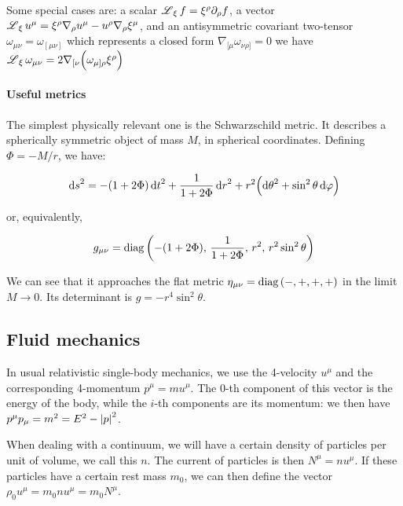 \documentclass[main.tex]{subfiles}
\begin{document}
Some special cases are: a scalar \(\operatorname*{\mathscr L} _\xi f = \xi^\rho \partial_\rho f \), a vector \(\operatorname*{\mathscr L} _\xi u^\mu = \xi^\rho \nabla_\rho u^\mu -u^\rho \nabla_\rho \xi^\mu\), and  an antisymmetric covariant two-tensor \(\omega_{\mu\nu} = \omega_{[\mu \nu]}\) which represents a closed form \(\nabla_{[\mu} \omega_{\nu \rho]} = 0\) we have \(\operatorname*{\mathscr L} _\xi \omega_{\mu\nu} =2\nabla_{[\nu} \qty( \omega_{\mu] \rho} \xi^\rho )\)

\paragraph{Useful metrics}

The simplest physically relevant one is the Schwarzschild metric. It describes a spherically symmetric object of mass $M$, in spherical coordinates. Defining $\Phi = -M/r$, we have:

\begin{equation}
    \dd{s}^2 = -(1+2\Phi)\dd{t}^2 + \frac{1}{1+2\Phi} \dd{r}^2
    + r^2 \qty(\dd{\theta}^2 + \sin^2\theta \dd{\varphi}) \label{eq:schwartzshild-line-element}
\end{equation}

or, equivalently,

\begin{equation}
    g_{\mu\nu} =  \diag\qty(-(1+2\Phi),\, \frac{1}{1+2\Phi},\, r^2,\, r^2 \sin ^2 \theta )
\end{equation}

We can see that it approaches the flat metric $\eta_{\mu\nu} = \operatorname{diag}\qty(-, +, +, +)$ in the limit $M\rightarrow 0$. Its determinant is $g = -r^4 \sin^2 \theta$.

\subsection{Fluid mechanics}

In usual relativistic single-body mechanics, we use the 4-velocity $u^\mu$ and the corresponding 4-momentum $p^\mu = m u^\mu$. The 0-th component of this vector is the energy of the body, while the $i$-th components are its momentum: we then have $p^\mu p_\mu = m^2 = E^2 - \abs{p}^2$.

When dealing with a continuum, we will have a certain density of particles per unit of volume, we call this $n$. The current of particles is then $N^\mu = n u^\mu$. If these particles have a certain rest mass $m_0$, we can then define the vector $\rho_0 u^\mu = m_0 n u^\mu = m_0 N^\mu$.
\end{document}
